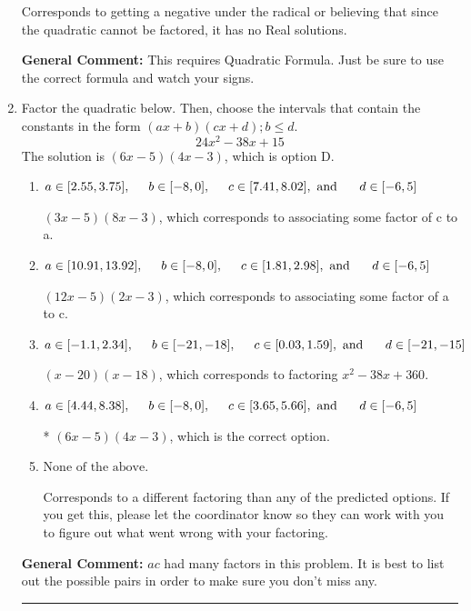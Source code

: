 \documentclass{extbook}[14pt]
\newcommand{\litem}[1]{\item #1

\rule{\textwidth}{0.4pt}}
\begin{document}
\begin{enumerate}
{\begin{enumerate}[label=\Alph*.]
Corresponds to getting a negative under the radical or believing that since the quadratic cannot be factored, it has no Real solutions.
\end{enumerate}

\textbf{General Comment:} This requires Quadratic Formula. Just be sure to use the correct formula and watch your signs.
}
\litem{
Factor the quadratic below. Then, choose the intervals that contain the constants in the form $(ax+b)(cx+d); b \leq d.$
\[ 24x^{2} -38 x + 15 \]The solution is \( (6x -5)(4x -3) \), which is option D.\begin{enumerate}[label=\Alph*.]
\item \( a \in [2.55, 3.75], \hspace*{5mm} b \in [-8, 0], \hspace*{5mm} c \in [7.41, 8.02], \text{ and } \hspace*{5mm} d \in [-6, 5] \)

 $(3x -5)(8x -3)$, which corresponds to associating some factor of c to a.
\item \( a \in [10.91, 13.92], \hspace*{5mm} b \in [-8, 0], \hspace*{5mm} c \in [1.81, 2.98], \text{ and } \hspace*{5mm} d \in [-6, 5] \)

 $(12x -5)(2x -3)$, which corresponds to associating some factor of a to c.
\item \( a \in [-1.1, 2.34], \hspace*{5mm} b \in [-21, -18], \hspace*{5mm} c \in [0.03, 1.59], \text{ and } \hspace*{5mm} d \in [-21, -15] \)

 $(x -20)(x -18)$, which corresponds to factoring $x^{2} -38 x + 360$.
\item \( a \in [4.44, 8.38], \hspace*{5mm} b \in [-8, 0], \hspace*{5mm} c \in [3.65, 5.66], \text{ and } \hspace*{5mm} d \in [-6, 5] \)

* $(6x -5)(4x -3)$, which is the correct option.
\item \( \text{None of the above.} \)

 Corresponds to a different factoring than any of the predicted options. If you get this, please let the coordinator know so they can work with you to figure out what went wrong with your factoring.
\end{enumerate}

\textbf{General Comment:} $ac$ had many factors in this problem. It is best to list out the possible pairs in order to make sure you don't miss any.
}
\end{enumerate}
\end{document}
